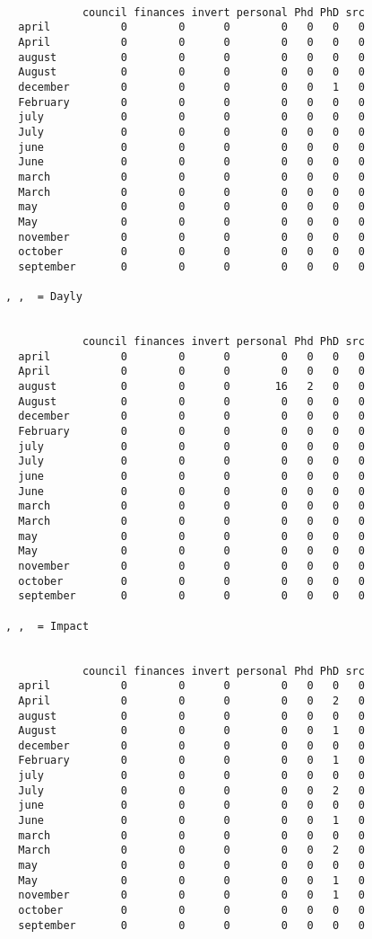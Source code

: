 \begin{verbatim}
           
            council finances invert personal Phd PhD src
  april           0        0      0        0   0   0   0
  April           0        0      0        0   0   0   0
  august          0        0      0        0   0   0   0
  August          0        0      0        0   0   0   0
  december        0        0      0        0   0   1   0
  February        0        0      0        0   0   0   0
  july            0        0      0        0   0   0   0
  July            0        0      0        0   0   0   0
  june            0        0      0        0   0   0   0
  June            0        0      0        0   0   0   0
  march           0        0      0        0   0   0   0
  March           0        0      0        0   0   0   0
  may             0        0      0        0   0   0   0
  May             0        0      0        0   0   0   0
  november        0        0      0        0   0   0   0
  october         0        0      0        0   0   0   0
  september       0        0      0        0   0   0   0

, ,  = Dayly

           
            council finances invert personal Phd PhD src
  april           0        0      0        0   0   0   0
  April           0        0      0        0   0   0   0
  august          0        0      0       16   2   0   0
  August          0        0      0        0   0   0   0
  december        0        0      0        0   0   0   0
  February        0        0      0        0   0   0   0
  july            0        0      0        0   0   0   0
  July            0        0      0        0   0   0   0
  june            0        0      0        0   0   0   0
  June            0        0      0        0   0   0   0
  march           0        0      0        0   0   0   0
  March           0        0      0        0   0   0   0
  may             0        0      0        0   0   0   0
  May             0        0      0        0   0   0   0
  november        0        0      0        0   0   0   0
  october         0        0      0        0   0   0   0
  september       0        0      0        0   0   0   0

, ,  = Impact

           
            council finances invert personal Phd PhD src
  april           0        0      0        0   0   0   0
  April           0        0      0        0   0   2   0
  august          0        0      0        0   0   0   0
  August          0        0      0        0   0   1   0
  december        0        0      0        0   0   0   0
  February        0        0      0        0   0   1   0
  july            0        0      0        0   0   0   0
  July            0        0      0        0   0   2   0
  june            0        0      0        0   0   0   0
  June            0        0      0        0   0   1   0
  march           0        0      0        0   0   0   0
  March           0        0      0        0   0   2   0
  may             0        0      0        0   0   0   0
  May             0        0      0        0   0   1   0
  november        0        0      0        0   0   1   0
  october         0        0      0        0   0   0   0
  september       0        0      0        0   0   0   0


\end{verbatim}
